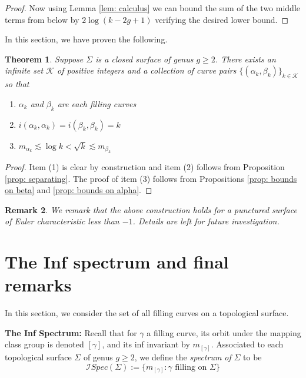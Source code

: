 \documentclass[12pt]{amsart}
\numberwithin{equation}{section}
\theoremstyle{plain}
\newtheorem{thm}{Theorem}[section]
\newtheorem{rem}[thm]{Remark}
\begin{document}
\begin{proof}
  Now using Lemma \ref{lem: calculus} we can bound the sum of the two middle terms from below by  $2 \log (k-2g+1)$ verifying the desired lower bound. 
   \end{proof}

\vskip10pt


In this section, we have proven the following. 
\begin{thm}
\label{thm: separating curve construction} Suppose  $\Sigma$ is a closed surface of genus $g \geq 2$. There exists an infinite set $\mathcal{K}$ of positive integers  and 
a collection of curve pairs $\{(\alpha_{k},\beta_{k})\}_{k \in \mathcal{K}}$ so that


\begin{enumerate}
\item  $\alpha_k$ and $\beta_k$ are each filling curves

\item $i(\alpha_k, \alpha_k)=i(\beta_k, \beta_k)=k$

\item $m_{\alpha_k}\lesssim \log k < \sqrt{k}\lesssim  m_{\beta_k}$
\end{enumerate}
\end{thm}

\begin{proof} Item (1) is clear {by construction} and item  (2) follows  from Proposition 
\ref{prop: separating}.
The proof of item (3)  follows from Propositions \ref{prop: bounds on beta} and \ref{prop: bounds on alpha}.


 \end{proof}

\begin{rem}
 We remark that the above construction holds for a punctured surface of Euler characteristic less than $-1$. Details are left for future investigation. 
 
\end{rem} 




 
 
\section{The Inf spectrum and final remarks}
\label{sec: Final Remarks}
In this section, we consider the set of all filling curves  on a topological surface.
\vskip10pt

\noindent \textbf{The Inf Spectrum:}
Recall that for $\gamma$ a filling curve,  its orbit under the mapping class group  is denoted  $[\gamma]$, and  its inf invariant by   $m_{[\gamma]}$. Associated to each topological surface $\Sigma$ of genus $g\geq 2$,  we
 define the {\it {}  spectrum of } $\Sigma$  to be
 $$
 \mathcal{I}Spec (\Sigma) := \{m_{[\gamma]}: \gamma \text{ filling on } \Sigma \}
 $$
\end{document}
